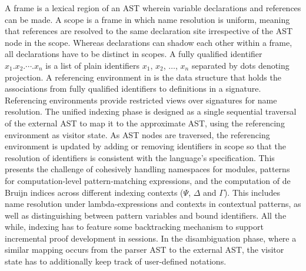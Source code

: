 A frame is a lexical region of an \ac{AST} wherein variable declarations and references can be made.
A scope is a frame in which name resolution is uniform, meaning that references are resolved to the same declaration site irrespective of the \ac{AST} node in the scope.
Whereas declarations can shadow each other within a frame, all declarations have to be distinct in scopes.
A fully qualified identifier $x_1.x_2.\cdots.x_n$ is a list of plain identifiers $x_1$, $x_2$, $\dots$, $x_n$ separated by dots denoting projection.
A referencing environment in \Beluga is the data structure that holds the associations from fully qualified identifiers to definitions in a signature.
Referencing environments provide restricted views over signatures for name resolution.
The unified indexing phase is designed as a single sequential traversal of the external \ac{AST} to map it to the approximate \ac{AST}, using the referencing environment as visitor state.
As \ac{AST} nodes are traversed, the referencing environment is updated by adding or removing identifiers in scope so that the resolution of identifiers is consistent with the language's specification.
This presents the challenge of cohesively handling namespaces for modules, patterns for computation-level pattern-matching expressions, and the computation of de Bruijn indices across different indexing contexts ($\Psi$, $\Delta$ and $\Gamma$).
This includes name resolution under lambda-expressions and contexts in contextual \LF patterns, as well as distinguishing between pattern variables and bound identifiers.
All the while, indexing has to feature some backtracking mechanism to support incremental proof development in \Harpoon sessions.
In the disambiguation phase, where a similar mapping occurs from the parser \ac{AST} to the external \ac{AST}, the visitor state has to additionally keep track of user-defined notations.


